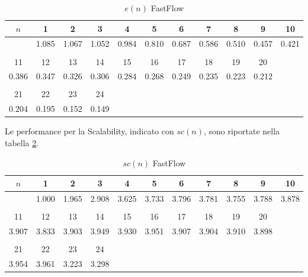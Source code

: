 \documentclass[12pt]{article}
\begin{document}
\begin{table}[!htbp]
\centering
\caption{$e(n)$ FastFlow}
\label{ffef}
\begin{tabular}{c c c c c c c c c c c }
$n$ & 1 & 2 & 3 & 4 & 5 & 6 & 7 & 8 & 9 & 10   \\ \hline
& 1.085 & 1.067 & 1.052 & 0.984 & 0.810 & 0.687 & 0.586 & 0.510 & 0.457 & 0.421
  \\ \\
11 & 12 & 13 & 14 & 15 & 16 &17 & 18 & 19 & 20 \\ \hline
0.386 & 0.347 & 0.326 & 0.306 & 0.284 & 0.268 & 0.249 & 0.235 & 0.223 & 0.212
  \\ \\
21 & 22 & 23 & 24 \\ \hline
0.204 & 0.195 & 0.152 & 0.149
\end{tabular}
\end{table}
Le performance per la Scalability, indicato con $sc(n)$, sono riportate nella tabella \ref{ffsc}.
\begin{table}[!htbp]
\centering
\caption{$sc(n)$ FastFlow}
\label{ffsc}
\begin{tabular}{c c c c c c c c c c c }
$n$ & 1 & 2 & 3 & 4 & 5 & 6 & 7 & 8 & 9 & 10   \\ \hline
& 1.000 & 1.965 & 2.908 & 3.625 & 3.733 & 3.796 & 3.781 & 3.755 & 3.788 & 3.878 
 \\ \\
11 & 12 & 13 & 14 & 15 & 16 &17 & 18 & 19 & 20 \\ \hline
3.907 & 3.833 & 3.903 & 3.949 & 3.930 & 3.951 & 3.907 & 3.904 & 3.910 & 3.898
 \\ \\
21 & 22 & 23 & 24 \\ \hline
3.954 & 3.961 & 3.223 & 3.298
\end{tabular}
\end{table}
\end{document}
